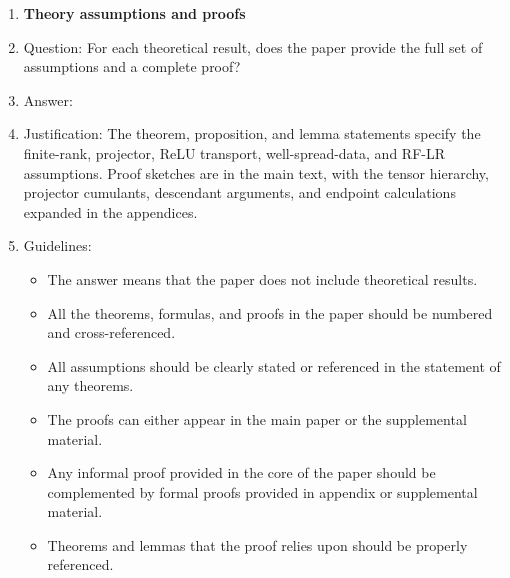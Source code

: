 \documentclass{article}
\begin{document}
\begin{enumerate}[leftmargin=1.5em]
\item {\bf Theory assumptions and proofs}
    \item[] Question: For each theoretical result, does the paper provide the full set of assumptions and a complete proof?
    \item[] Answer: \answerYes{}
    \item[] Justification: The theorem, proposition, and lemma statements specify the finite-rank, projector, ReLU transport, well-spread-data, and RF-LR assumptions. Proof sketches are in the main text, with the tensor hierarchy, projector cumulants, descendant arguments, and endpoint calculations expanded in the appendices.
    \item[] Guidelines:
    \begin{itemize}
        \item The answer \answerNA{} means that the paper does not include theoretical results.
        \item All the theorems, formulas, and proofs in the paper should be numbered and cross-referenced.
        \item All assumptions should be clearly stated or referenced in the statement of any theorems.
        \item The proofs can either appear in the main paper or the supplemental material.
        \item Any informal proof provided in the core of the paper should be complemented by formal proofs provided in appendix or supplemental material.
        \item Theorems and lemmas that the proof relies upon should be properly referenced.
    \end{itemize}


\end{enumerate}
\end{document}
